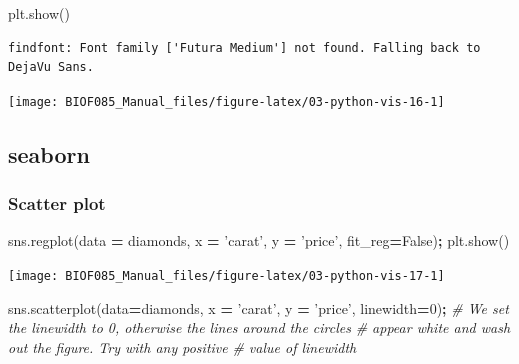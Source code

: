 \documentclass[
  letterpaper,
]{scrbook}
\newenvironment{Shaded}{\begin{snugshade}}{\end{snugshade}}
\newcommand{\CommentTok}[1]{\textcolor[rgb]{0.56,0.35,0.01}{\textit{#1}}}
\newcommand{\DecValTok}[1]{\textcolor[rgb]{0.00,0.00,0.81}{#1}}
\newcommand{\NormalTok}[1]{#1}
\newcommand{\OperatorTok}[1]{\textcolor[rgb]{0.81,0.36,0.00}{\textbf{#1}}}
\newcommand{\StringTok}[1]{\textcolor[rgb]{0.31,0.60,0.02}{#1}}
\newcommand{\VariableTok}[1]{\textcolor[rgb]{0.00,0.00,0.00}{#1}}
\begin{document}
\begin{Shaded}
\begin{Highlighting}[]
\NormalTok{plt.show()}
\end{Highlighting}
\end{Shaded}

\begin{verbatim}
findfont: Font family ['Futura Medium'] not found. Falling back to DejaVu Sans.
\end{verbatim}

\begin{center}\texttt{[image: BIOF085\_Manual\_files/figure-latex/03-python-vis-16-1]} \end{center}

\hypertarget{seaborn-1}{%
\subsection{seaborn}\label{seaborn-1}}

\hypertarget{scatter-plot-1}{%
\subsubsection{Scatter plot}\label{scatter-plot-1}}

\begin{Shaded}
\begin{Highlighting}[]
\NormalTok{sns.regplot(data }\OperatorTok{=}\NormalTok{ diamonds, x }\OperatorTok{=} \StringTok{'carat'}\NormalTok{, y }\OperatorTok{=} \StringTok{'price'}\NormalTok{, fit_reg}\OperatorTok{=}\VariableTok{False}\NormalTok{)}\OperatorTok{;}
\NormalTok{plt.show()}
\end{Highlighting}
\end{Shaded}

\begin{center}\texttt{[image: BIOF085\_Manual\_files/figure-latex/03-python-vis-17-1]} \end{center}

\begin{Shaded}
\begin{Highlighting}[]
\NormalTok{sns.scatterplot(data}\OperatorTok{=}\NormalTok{diamonds, x }\OperatorTok{=} \StringTok{'carat'}\NormalTok{, y }\OperatorTok{=} \StringTok{'price'}\NormalTok{, linewidth}\OperatorTok{=}\DecValTok{0}\NormalTok{)}\OperatorTok{;} 
\CommentTok{# We set the linewidth to 0, otherwise the lines around the circles}
\CommentTok{# appear white and wash out the figure. Try with any positive }
\CommentTok{# value of linewidth}
\end{Highlighting}
\end{Shaded}
\end{document}
